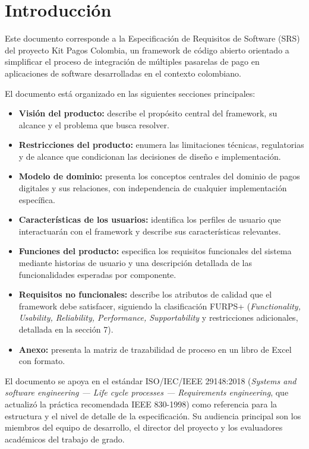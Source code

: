 \section{Introducción}

Este documento corresponde a la Especificación de Requisitos de Software (SRS) del proyecto Kit Pagos Colombia, un framework de código abierto orientado a simplificar el proceso de integración de múltiples pasarelas de pago en aplicaciones de software desarrolladas en el contexto colombiano.

El documento está organizado en las siguientes secciones principales:

\begin{itemize}
  \item \textbf{Visión del producto:} describe el propósito central del framework, su alcance y el problema que busca resolver.
  \item \textbf{Restricciones del producto:} enumera las limitaciones técnicas, regulatorias y de alcance que condicionan las decisiones de diseño e implementación.
  \item \textbf{Modelo de dominio:} presenta los conceptos centrales del dominio de pagos digitales y sus relaciones, con independencia de cualquier implementación específica.
  \item \textbf{Características de los usuarios:} identifica los perfiles de usuario que interactuarán con el framework y describe sus características relevantes.
  \item \textbf{Funciones del producto:} especifica los requisitos funcionales del sistema mediante historias de usuario y una descripción detallada de las funcionalidades esperadas por componente.
  \item \textbf{Requisitos no funcionales:} describe los atributos de calidad que el framework debe satisfacer, siguiendo la clasificación FURPS+ (\textit{Functionality, Usability, Reliability, Performance, Supportability} y restricciones adicionales, detallada en la sección 7).
  \item \textbf{Anexo:} presenta la matriz de trazabilidad de proceso en un libro de Excel con formato.
\end{itemize}

El documento se apoya en el estándar ISO/IEC/IEEE 29148:2018 (\textit{Systems and software engineering --- Life cycle processes --- Requirements engineering}, que actualizó la práctica recomendada IEEE 830-1998) como referencia para la estructura y el nivel de detalle de la especificación. Su audiencia principal son los miembros del equipo de desarrollo, el director del proyecto y los evaluadores académicos del trabajo de grado.
